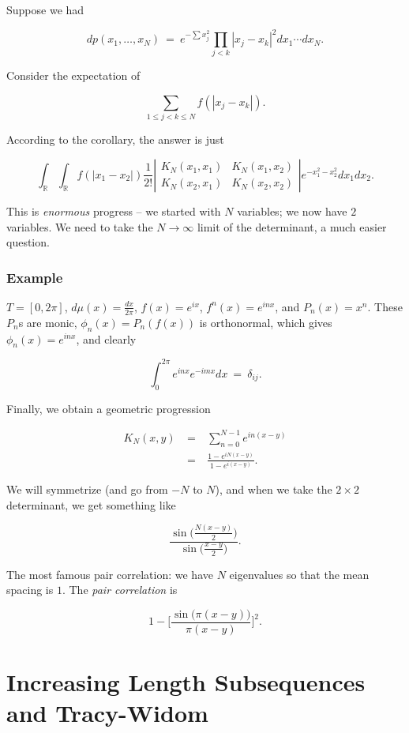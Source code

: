 \documentclass[12pt,letterpaper]{report}
\newcommand\be{\begin{equation}}
\newcommand\ee{\end{equation}}
\newcommand\bea{\begin{eqnarray}}
\newcommand\eea{\end{eqnarray}}
\newcommand{\R}{\ensuremath{\mathbb{R}}}
\newcommand{\dettwo}[4]
{\left|\begin{array}{cc}
                        #1  & #2   \\
                        #3 &  #4
                          \end{array}\right| }
\begin{document}
Suppose we had

\be dp(x_1,\dots,x_N) \ = \ e^{- \sum x_j^2} \prod_{j<k} |x_j -
x_k|^2 dx_1 \cdots dx_N. \ee

Consider the expectation of

\be \sum_{1 \le j < k \le N} f(|x_j-x_k|). \ee

According to the corollary, the answer is just

\be \int_\R \int_\R f(|x_1-x_2|) \frac{1}{2!}
\dettwo{K_N(x_1,x_1)}{K_N(x_1,x_2)}{K_N(x_2,x_1)}{K_N(x_2,x_2)}
e^{-x_1^2 - x_2^2} dx_1dx_2. \ee

This is \emph{enormous} progress -- we started with $N$ variables;
we now have $2$ variables. We need to take the $N \to \infty$
limit of the determinant, a much easier question.


\subsection{Example}

$T = [0,2\pi]$, $d\mu(x) = \frac{dx}{2\pi}$, $f(x) = e^{ix}$,
$f^n(x) = e^{inx}$, and $P_n(x) = x^n$. These $P_n$s are monic,
$\phi_n(x) = P_n(f(x))$ is orthonormal, which gives $\phi_n(x) =
e^{inx}$, and clearly

\be \int_0^{2\pi} e^{inx} e^{-imx} dx \ = \ \delta_{ij}. \ee

Finally, we obtain a geometric progression

\bea K_N(x,y) & \ = \ & \sum_{n=0}^{N-1} e^{in(x-y)} \nonumber\\ &
\ = \ & \frac{1 - e^{iN(x-y)}}{1 - e^{i(x-y)}}. \eea

We will symmetrize (and go from $-N$ to $N$), and when we take the
$2 \times 2$ determinant, we get something like

\be \frac{ \sin\Big( \frac{N(x-y)}{2} \Big) }{ \sin \Big(
\frac{x-y}{2} \Big) }. \ee

The most famous pair correlation: we have $N$ eigenvalues so that
the mean spacing is $1$. The \emph{pair correlation} is

\be 1 - \Bigg[\frac{\sin\Big( \pi (x-y) \Big) }{ \pi (x-y) }
\Bigg]^2. \ee



\chapter{Increasing Length Subsequences and Tracy-Widom}
\end{document}
